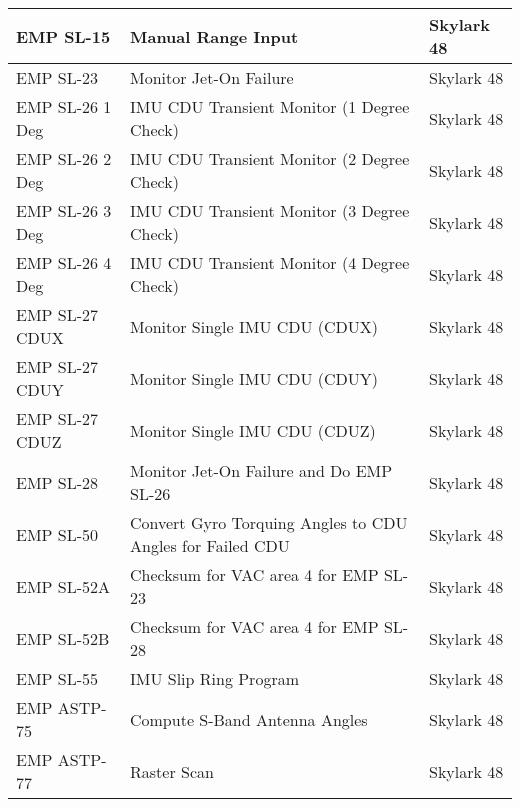 \documentclass[11pt]{article} %
\begin{document}
\begin{tabular}{|l|L{9cm}|l|}
\hline
EMP SL-15&Manual Range Input&Skylark 48\\
\hline
EMP SL-23&Monitor Jet-On Failure&Skylark 48\\
\hline
EMP SL-26 1 Deg&IMU CDU Transient Monitor (1 Degree Check)&Skylark 48\\
\hline
EMP SL-26 2 Deg&IMU CDU Transient Monitor (2 Degree Check)&Skylark 48\\
\hline
EMP SL-26 3 Deg&IMU CDU Transient Monitor (3 Degree Check)&Skylark 48\\
\hline
EMP SL-26 4 Deg&IMU CDU Transient Monitor (4 Degree Check)&Skylark 48\\
\hline
EMP SL-27 CDUX&Monitor Single IMU CDU (CDUX)&Skylark 48\\
\hline
EMP SL-27 CDUY&Monitor Single IMU CDU (CDUY)&Skylark 48\\
\hline
EMP SL-27 CDUZ&Monitor Single IMU CDU (CDUZ)&Skylark 48\\
\hline
EMP SL-28&Monitor Jet-On Failure and Do EMP SL-26&Skylark 48\\
\hline
EMP SL-50&Convert Gyro Torquing Angles to CDU Angles for Failed CDU&Skylark 48\\
\hline
EMP SL-52A&Checksum for VAC area 4 for EMP SL-23&Skylark 48\\
\hline
EMP SL-52B&Checksum for VAC area 4 for EMP SL-28&Skylark 48\\
\hline
EMP SL-55&IMU Slip Ring Program&Skylark 48\\
\hline
EMP ASTP-75&Compute S-Band Antenna Angles&Skylark 48\\
\hline
EMP ASTP-77&Raster Scan&Skylark 48\\
\hline
\end{tabular}
\end{document}
